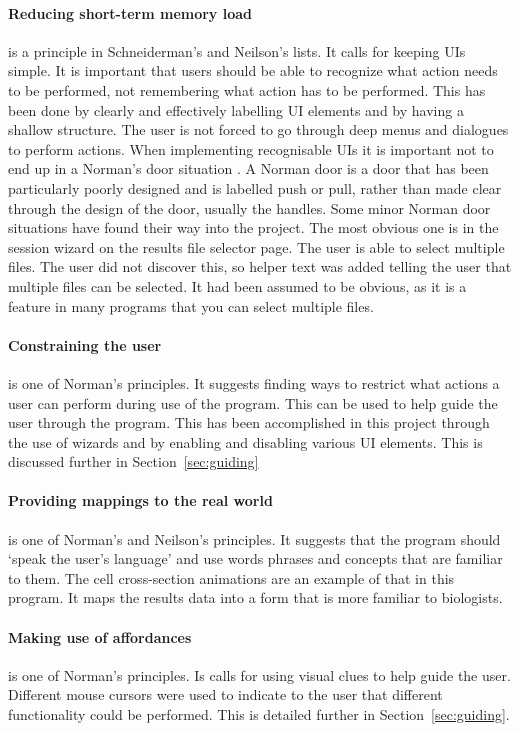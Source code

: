 \paragraph*{Reducing short-term memory load} is a principle in Schneiderman's and Neilson's lists.  It calls for keeping \acp{UI} simple.  It is important that users should be able to recognize what action needs to be performed, not remembering what action has to be performed.  This has been done by clearly and effectively labelling \ac{UI} elements and by having a shallow structure.  The user is not forced to go through deep menus and dialogues to perform actions.  When implementing recognisable \acp{UI} it is important not to end up in a Norman's door situation .  A Norman door is a door that has been particularly poorly designed and is labelled push or pull, rather than made clear through the design of the door, usually the handles.  Some minor Norman door situations have found their way into the project.  The most obvious one is in the session wizard on the results file selector page.  The user is able to select multiple files.  The user did not discover this, so helper text was added telling the user that multiple files can be selected.  It had been assumed to be obvious, as it is a feature in many programs that you can select multiple files.

\paragraph*{Constraining the user} is one of Norman's principles.  It suggests finding ways to restrict what actions a user can perform during use of the program.  This can be used to help guide the user through the program.  This has been accomplished in this project through the use of wizards and by enabling and disabling various \ac{UI} elements.  This is discussed further in Section~\ref{sec:guiding}

\paragraph*{Providing mappings to the real world} is one of Norman's and Neilson's principles.  It suggests that the program should `speak the user's language' and use words phrases and concepts that are familiar to them.  The cell cross-section animations are an example of that in this program.  It maps the results data into a form that is more familiar to biologists.

\paragraph*{Making use of affordances} is one of Norman's principles.  Is calls for using visual clues to help guide the user.  Different mouse cursors were used to indicate to the user that different functionality could be performed.  This is detailed further in Section~\ref{sec:guiding}.

